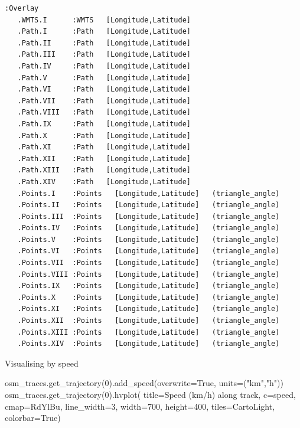 \documentclass[
  letterpaper,
  DIV=11,
  numbers=noendperiod]{scrreprt}
\newenvironment{Shaded}{\begin{snugshade}}{\end{snugshade}}
\newcommand{\DecValTok}[1]{\textcolor[rgb]{0.68,0.00,0.00}{#1}}
\newcommand{\NormalTok}[1]{\textcolor[rgb]{0.00,0.23,0.31}{#1}}
\newcommand{\OperatorTok}[1]{\textcolor[rgb]{0.37,0.37,0.37}{#1}}
\newcommand{\StringTok}[1]{\textcolor[rgb]{0.13,0.47,0.30}{#1}}
\newcommand{\VariableTok}[1]{\textcolor[rgb]{0.07,0.07,0.07}{#1}}
\begin{document}
\begin{verbatim}
:Overlay
   .WMTS.I      :WMTS   [Longitude,Latitude]
   .Path.I      :Path   [Longitude,Latitude]
   .Path.II     :Path   [Longitude,Latitude]
   .Path.III    :Path   [Longitude,Latitude]
   .Path.IV     :Path   [Longitude,Latitude]
   .Path.V      :Path   [Longitude,Latitude]
   .Path.VI     :Path   [Longitude,Latitude]
   .Path.VII    :Path   [Longitude,Latitude]
   .Path.VIII   :Path   [Longitude,Latitude]
   .Path.IX     :Path   [Longitude,Latitude]
   .Path.X      :Path   [Longitude,Latitude]
   .Path.XI     :Path   [Longitude,Latitude]
   .Path.XII    :Path   [Longitude,Latitude]
   .Path.XIII   :Path   [Longitude,Latitude]
   .Path.XIV    :Path   [Longitude,Latitude]
   .Points.I    :Points   [Longitude,Latitude]   (triangle_angle)
   .Points.II   :Points   [Longitude,Latitude]   (triangle_angle)
   .Points.III  :Points   [Longitude,Latitude]   (triangle_angle)
   .Points.IV   :Points   [Longitude,Latitude]   (triangle_angle)
   .Points.V    :Points   [Longitude,Latitude]   (triangle_angle)
   .Points.VI   :Points   [Longitude,Latitude]   (triangle_angle)
   .Points.VII  :Points   [Longitude,Latitude]   (triangle_angle)
   .Points.VIII :Points   [Longitude,Latitude]   (triangle_angle)
   .Points.IX   :Points   [Longitude,Latitude]   (triangle_angle)
   .Points.X    :Points   [Longitude,Latitude]   (triangle_angle)
   .Points.XI   :Points   [Longitude,Latitude]   (triangle_angle)
   .Points.XII  :Points   [Longitude,Latitude]   (triangle_angle)
   .Points.XIII :Points   [Longitude,Latitude]   (triangle_angle)
   .Points.XIV  :Points   [Longitude,Latitude]   (triangle_angle)
\end{verbatim}

Visualising by speed

\begin{Shaded}
\begin{Highlighting}[]
\NormalTok{osm\_traces.get\_trajectory(}\DecValTok{0}\NormalTok{).add\_speed(overwrite}\OperatorTok{=}\VariableTok{True}\NormalTok{, units}\OperatorTok{=}\NormalTok{(}\StringTok{"km"}\NormalTok{,}\StringTok{"h"}\NormalTok{))}
\NormalTok{osm\_traces.get\_trajectory(}\DecValTok{0}\NormalTok{).hvplot(}
\NormalTok{    title}\OperatorTok{=}\StringTok{\textquotesingle{}Speed (km/h) along track\textquotesingle{}}\NormalTok{, c}\OperatorTok{=}\StringTok{\textquotesingle{}speed\textquotesingle{}}\NormalTok{, cmap}\OperatorTok{=}\StringTok{\textquotesingle{}RdYlBu\textquotesingle{}}\NormalTok{,}
\NormalTok{    line\_width}\OperatorTok{=}\DecValTok{3}\NormalTok{, width}\OperatorTok{=}\DecValTok{700}\NormalTok{, height}\OperatorTok{=}\DecValTok{400}\NormalTok{, tiles}\OperatorTok{=}\StringTok{\textquotesingle{}CartoLight\textquotesingle{}}\NormalTok{, colorbar}\OperatorTok{=}\VariableTok{True}\NormalTok{)}
\end{Highlighting}
\end{Shaded}
\end{document}

